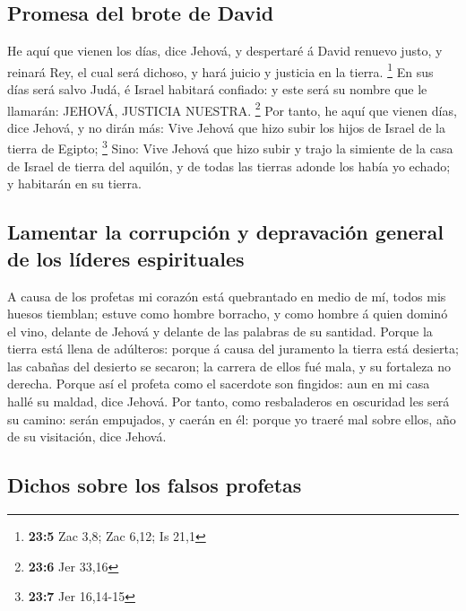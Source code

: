 \hypertarget{promesa-del-brote-de-david}{%
\subsection{Promesa del brote de
David}\label{promesa-del-brote-de-david}}

 He aquí que vienen los días, dice Jehová, y despertaré á
David renuevo justo, y reinará Rey, el cual será dichoso, y hará juicio
y justicia en la tierra. \footnote{\textbf{23:5} Zac 3,8; Zac 6,12; Is
  21,1}  En sus días será salvo Judá, é Israel habitará
confiado: y este será su nombre que le llamarán: JEHOVÁ, JUSTICIA
NUESTRA. \footnote{\textbf{23:6} Jer 33,16}  Por tanto, he
aquí que vienen días, dice Jehová, y no dirán más: Vive Jehová que hizo
subir los hijos de Israel de la tierra de Egipto; \footnote{\textbf{23:7}
  Jer 16,14-15}  Sino: Vive Jehová que hizo subir y trajo
la simiente de la casa de Israel de tierra del aquilón, y de todas las
tierras adonde los había yo echado; y habitarán en su tierra.

\hypertarget{lamentar-la-corrupciuxf3n-y-depravaciuxf3n-general-de-los-luxedderes-espirituales}{%
\subsection{Lamentar la corrupción y depravación general de los líderes
espirituales}\label{lamentar-la-corrupciuxf3n-y-depravaciuxf3n-general-de-los-luxedderes-espirituales}}

 A causa de los profetas mi corazón está quebrantado en
medio de mí, todos mis huesos tiemblan; estuve como hombre borracho, y
como hombre á quien dominó el vino, delante de Jehová y delante de las
palabras de su santidad.  Porque la tierra está llena de
adúlteros: porque á causa del juramento la tierra está desierta; las
cabañas del desierto se secaron; la carrera de ellos fué mala, y su
fortaleza no derecha.  Porque así el profeta como el
sacerdote son fingidos: aun en mi casa hallé su maldad, dice Jehová.
 Por tanto, como resbaladeros en oscuridad les será su
camino: serán empujados, y caerán en él: porque yo traeré mal sobre
ellos, año de su visitación, dice Jehová.

\hypertarget{dichos-sobre-los-falsos-profetas}{%
\subsection{Dichos sobre los falsos
profetas}\label{dichos-sobre-los-falsos-profetas}}

